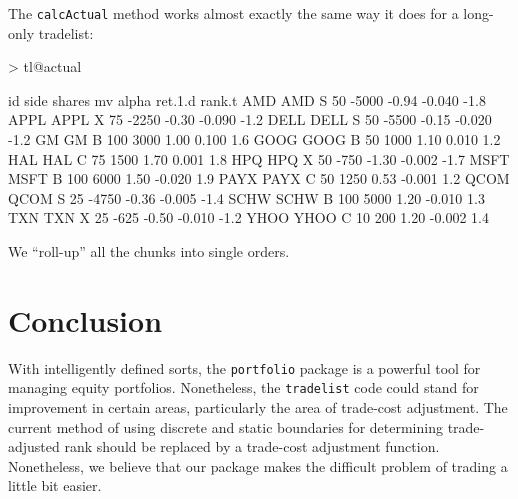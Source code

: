 \documentclass{article}
\begin{document}
The \texttt{calcActual} method works almost exactly the same way it
does for a long-only tradelist: 

\begin{Schunk}
\begin{Sinput}
> tl@actual
\end{Sinput}
\begin{Soutput}
       id side shares    mv alpha ret.1.d rank.t
AMD   AMD    S     50 -5000 -0.94  -0.040   -1.8
APPL APPL    X     75 -2250 -0.30  -0.090   -1.2
DELL DELL    S     50 -5500 -0.15  -0.020   -1.2
GM     GM    B    100  3000  1.00   0.100    1.6
GOOG GOOG    B     50  1000  1.10   0.010    1.2
HAL   HAL    C     75  1500  1.70   0.001    1.8
HPQ   HPQ    X     50  -750 -1.30  -0.002   -1.7
MSFT MSFT    B    100  6000  1.50  -0.020    1.9
PAYX PAYX    C     50  1250  0.53  -0.001    1.2
QCOM QCOM    S     25 -4750 -0.36  -0.005   -1.4
SCHW SCHW    B    100  5000  1.20  -0.010    1.3
TXN   TXN    X     25  -625 -0.50  -0.010   -1.2
YHOO YHOO    C     10   200  1.20  -0.002    1.4
\end{Soutput}
\end{Schunk}

We ``roll-up'' all the chunks into single orders.

\section{Conclusion}

With intelligently defined sorts, the \texttt{portfolio} package is a
powerful tool for managing equity portfolios.  Nonetheless, the
\texttt{tradelist} code could stand for improvement in certain areas,
particularly the area of trade-cost adjustment.  The current method of
using discrete and static boundaries for determining trade-adjusted
rank should be replaced by a trade-cost adjustment function.
Nonetheless, we believe that our package makes the difficult problem
of trading a little bit easier.
\end{document}
